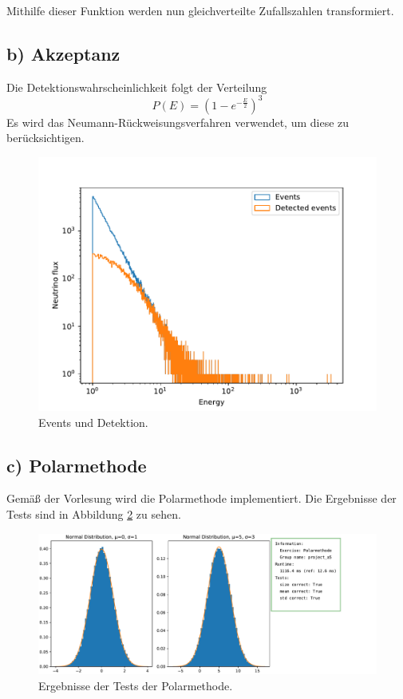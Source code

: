     \noindent Mithilfe dieser Funktion werden nun gleichverteilte Zufallszahlen
    transformiert.

\subsection{b) Akzeptanz}
    Die Detektionswahrscheinlichkeit folgt der Verteilung
    \begin{equation*}
        P(E) = \left( 1 - e^{- \frac{E}{2}} \right)^3
    \end{equation*}
    Es wird das Neumann-Rückweisungsverfahren verwendet, um diese zu 
    berücksichtigen.

    \begin{figure}
        \centering
        \includegraphics[width=\textwidth]{neutrinos.pdf}
        \caption{Events und Detektion.}
        \label{fig:det}
    \end{figure}
    \FloatBarrier

\subsection{c) Polarmethode}
    Gemäß der Vorlesung wird die Polarmethode implementiert. Die Ergebnisse der Tests sind in 
    Abbildung \ref{fig:polar} zu sehen.

    \begin{figure}
        \centering
        \includegraphics[width=\textwidth]{polar.pdf}
        \caption{Ergebnisse der Tests der Polarmethode.}
        \label{fig:polar}
    \end{figure}
    \FloatBarrier

